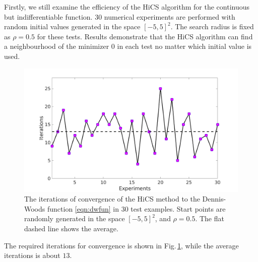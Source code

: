 \documentclass[final,1p,times]{elsarticle}
\begin{document}
Firstly, we still examine the efficiency of the HiCS algorithm
for the continuous but indifferentiable function. 
$30$ numerical experiments are performed with random 
initial values generated in the space $[-5,5]^2$. The search
radius is fixed as $\rho=0.5$ for these tests. 
Results demonstrate that the HiCS algorithm can find a neighbourhood of the
minimizer $0$ in each test no matter which initial value is used.
\begin{figure}[!htbp]
	\centering
	  \includegraphics[scale=0.3]{../figures/dwoodrand.png}
	  \caption{The iterations of convergence of the 
	  HiCS method to the Dennis-Woods function
	  \eqref{eqn:dwfun} in $30$ test examples.
	  Start points are randomly generated in the space
	  $[-5, 5]^2$, and $\rho=0.5$.
	  The flat dashed line shows the average.} 
	  \label{fig:dwfun:randInit}
\end{figure}
The required iterations for convergence is shown in 
Fig.\,\ref{fig:dwfun:randInit}, while the average iterations is
about $13$. 
\end{document}
